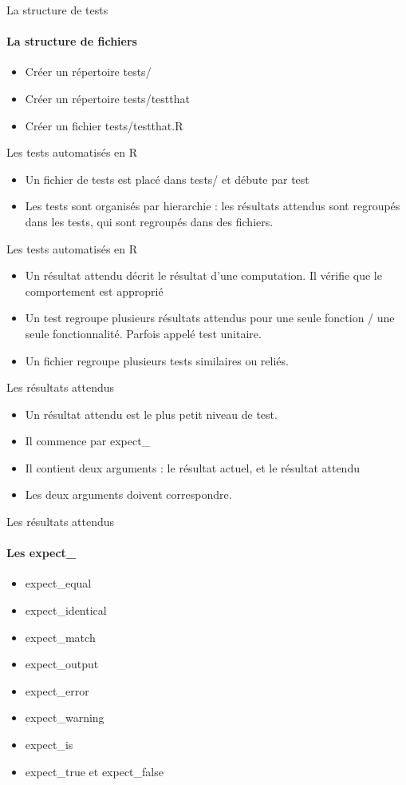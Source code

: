 \documentclass[11pt]{beamer}
\begin{document}
\begin{frame}{La structure de tests}
\framesubtitle{La structure de fichiers}
\begin{itemize}
\item Créer un répertoire tests/
\item Créer un répertoire tests/testthat
\item Créer un fichier tests/testthat.R
\end{itemize}
\end{frame}

\begin{frame}{Les tests automatisés en R}
\begin{itemize}
\item Un fichier de tests est placé dans tests/ et débute par test
\item Les tests sont organisés par hierarchie : les résultats attendus sont regroupés dans les tests, qui sont regroupés dans des fichiers. 
\end{itemize}
\end{frame}

\begin{frame}{Les tests automatisés en R}
\begin{itemize}
\item Un résultat attendu décrit le résultat d'une computation. Il vérifie que le comportement est approprié 
\item Un test regroupe plusieurs résultats attendus pour une seule fonction / une seule fonctionnalité. Parfois appelé test unitaire. 
\item Un fichier regroupe plusieurs tests similaires ou reliés. 
\end{itemize}
\end{frame}

\begin{frame}{Les résultats attendus}
\begin{itemize}
\item Un résultat attendu est le plus petit niveau de test. 
\item Il commence par expect\_
\item Il contient deux arguments : le résultat actuel, et le résultat attendu
\item Les deux arguments doivent correspondre. 
\end{itemize}
\end{frame}

\begin{frame}{Les résultats attendus}
\framesubtitle{Les expect\_}
\begin{itemize}
\item expect\_equal
\item expect\_identical
\item expect\_match
\item expect\_output
\item expect\_error
\item expect\_warning
\item expect\_is
\item expect\_true et expect\_false
\end{itemize}
\end{frame}
\end{document}
